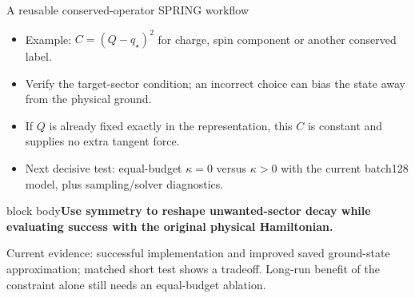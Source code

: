 \documentclass[aspectratio=169,10pt]{beamer}
\newcommand{\src}[1]{\vfill{\fontsize{6.3}{7.5}\selectfont\color{muted}#1\par}}
\newcommand{\take}[1]{\vspace{1mm}\begin{beamercolorbox}[sep=1.6mm,wd=\textwidth]{block body}\small\color{teal}\textbf{#1}\end{beamercolorbox}}
\begin{document}
\begin{frame}{A reusable conserved-operator SPRING workflow}
\begin{center}
\end{center}
\begin{itemize}\setlength\itemsep{7pt}
\item Example: $C=(Q-q_\star)^2$ for charge, spin component or another conserved label.
\item Verify the target-sector condition; an incorrect choice can bias the state away from the physical ground.
\item If $Q$ is already fixed exactly in the representation, this $C$ is constant and supplies no extra tangent force.
\item Next decisive test: equal-budget $\kappa=0$ versus $\kappa>0$ with the current batch128 model, plus sampling/solver diagnostics.
\end{itemize}
\take{Use symmetry to reshape unwanted-sector decay while evaluating success with the original physical Hamiltonian.}
\src{Current evidence: successful implementation and improved saved ground-state approximation; matched short test shows a tradeoff. Long-run benefit of the constraint alone still needs an equal-budget ablation.}
\end{frame}

\appendix
\end{document}
